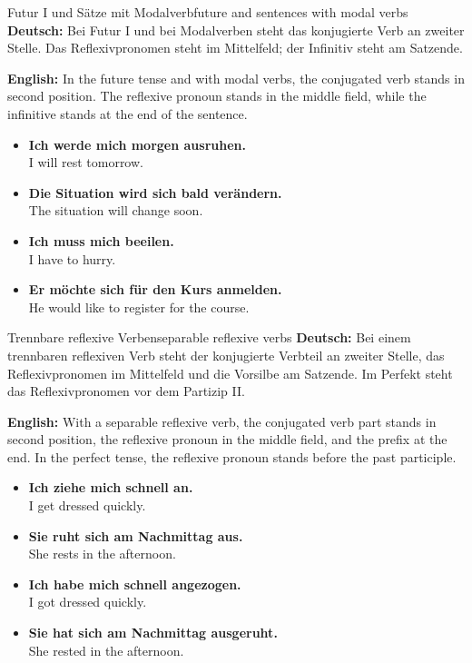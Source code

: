 \documentclass[a4paper,11pt]{article}
\newcommand{\GermanText}[1]{\textbf{Deutsch: }#1\par}
\newcommand{\EnglishText}[1]{{\small\color{SoftGray}\textbf{English: }#1\par}}
\newcommand{\ExampleItem}[2]{\item \textbf{#1}\\{\small\color{SoftGray}#2}}
\begin{document}
        \begin{grammarentry}{Futur I und Sätze mit Modalverb}{future and sentences with modal verbs}
            \GermanText{Bei Futur I und bei Modalverben steht das konjugierte Verb an zweiter Stelle. Das Reflexivpronomen steht im Mittelfeld; der Infinitiv steht am Satzende.}
            \EnglishText{In the future tense and with modal verbs, the conjugated verb stands in second position. The reflexive pronoun stands in the middle field, while the infinitive stands at the end of the sentence.}

            \begin{exbox}
                \begin{itemize}
                    \ExampleItem{Ich werde mich morgen ausruhen.}{I will rest tomorrow.}
                    \ExampleItem{Die Situation wird sich bald verändern.}{The situation will change soon.}
                    \ExampleItem{Ich muss mich beeilen.}{I have to hurry.}
                    \ExampleItem{Er möchte sich für den Kurs anmelden.}{He would like to register for the course.}
                \end{itemize}
            \end{exbox}
        \end{grammarentry}

        \begin{grammarentry}{Trennbare reflexive Verben}{separable reflexive verbs}
            \GermanText{Bei einem trennbaren reflexiven Verb steht der konjugierte Verbteil an zweiter Stelle, das Reflexivpronomen im Mittelfeld und die Vorsilbe am Satzende. Im Perfekt steht das Reflexivpronomen vor dem Partizip II.}
            \EnglishText{With a separable reflexive verb, the conjugated verb part stands in second position, the reflexive pronoun in the middle field, and the prefix at the end. In the perfect tense, the reflexive pronoun stands before the past participle.}

            \begin{exbox}
                \begin{itemize}
                    \ExampleItem{Ich ziehe mich schnell an.}{I get dressed quickly.}
                    \ExampleItem{Sie ruht sich am Nachmittag aus.}{She rests in the afternoon.}
                    \ExampleItem{Ich habe mich schnell angezogen.}{I got dressed quickly.}
                    \ExampleItem{Sie hat sich am Nachmittag ausgeruht.}{She rested in the afternoon.}
                \end{itemize}
            \end{exbox}
        \end{grammarentry}
\end{document}
